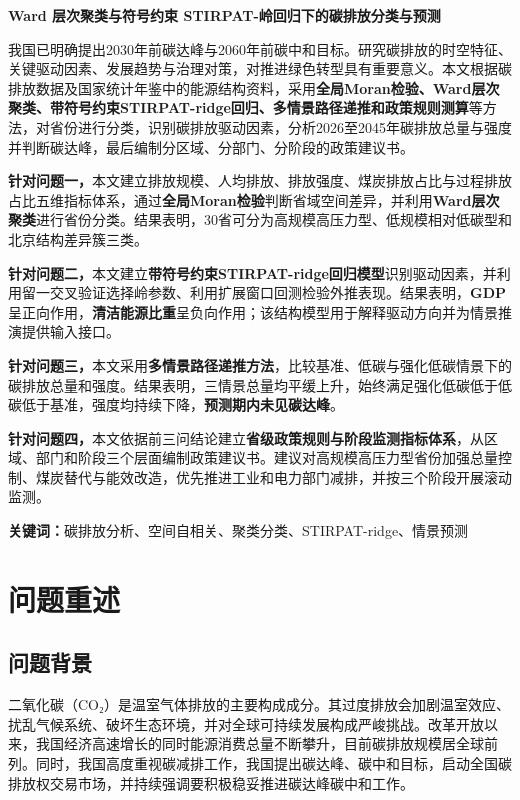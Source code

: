 \documentclass[12pt,a4paper]{ctexart}
\theoremstyle{definition}
\theoremstyle{plain}
\theoremstyle{remark}
\renewenvironment{abstract}
  {{\centering\heiti\zihao{-3}摘\quad 要\par}\vspace{0.5em}\zihao{-4}\songti}
  {\par\vspace{1em}}
\newcommand{\keywords}[1]{%
  \par\noindent\textbf{关键词：}#1}
\begin{document}
\pagestyle{plain}
\setcounter{page}{1}
\begin{center}
{\heiti\bfseries Ward 层次聚类与符号约束 STIRPAT-岭回归下的碳排放分类与预测}
\end{center}

\begin{abstract}
我国已明确提出2030年前碳达峰与2060年前碳中和目标。研究碳排放的时空特征、关键驱动因素、发展趋势与治理对策，对推进绿色转型具有重要意义。本文根据碳排放数据及国家统计年鉴中的能源结构资料，采用\textbf{全局Moran检验、Ward层次聚类、带符号约束STIRPAT-ridge回归、多情景路径递推和政策规则测算}等方法，对省份进行分类，识别碳排放驱动因素，分析2026至2045年碳排放总量与强度并判断碳达峰，最后编制分区域、分部门、分阶段的政策建议书。

\textbf{针对问题一，}本文建立排放规模、人均排放、排放强度、煤炭排放占比与过程排放占比五维指标体系，通过\textbf{全局Moran检验}判断省域空间差异，并利用\textbf{Ward层次聚类}进行省份分类。结果表明，30省可分为高规模高压力型、低规模相对低碳型和北京结构差异簇三类。

\textbf{针对问题二，}本文建立\textbf{带符号约束STIRPAT-ridge回归模型}识别驱动因素，并利用留一交叉验证选择岭参数、利用扩展窗口回测检验外推表现。结果表明，\textbf{GDP}呈正向作用，\textbf{清洁能源比重}呈负向作用；该结构模型用于解释驱动方向并为情景推演提供输入接口。

\textbf{针对问题三，}本文采用\textbf{多情景路径递推方法}，比较基准、低碳与强化低碳情景下的碳排放总量和强度。结果表明，三情景总量均平缓上升，始终满足强化低碳低于低碳低于基准，强度均持续下降，\textbf{预测期内未见碳达峰}。

\textbf{针对问题四，}本文依据前三问结论建立\textbf{省级政策规则与阶段监测指标体系}，从区域、部门和阶段三个层面编制政策建议书。建议对高规模高压力型省份加强总量控制、煤炭替代与能效改造，优先推进工业和电力部门减排，并按三个阶段开展滚动监测。
\end{abstract}

\keywords{碳排放分析、空间自相关、聚类分类、STIRPAT-ridge、情景预测}

\section{问题重述}

\subsection{问题背景}
二氧化碳（CO₂）是温室气体排放的主要构成成分。其过度排放会加剧温室效应、扰乱气候系统、破坏生态环境，并对全球可持续发展构成严峻挑战。改革开放以来，我国经济高速增长的同时能源消费总量不断攀升，目前碳排放规模居全球前列。同时，我国高度重视碳减排工作，我国提出碳达峰、碳中和目标，启动全国碳排放权交易市场，并持续强调要积极稳妥推进碳达峰碳中和工作。
\end{document}
